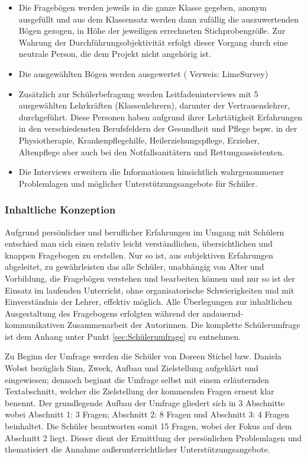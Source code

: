 \begin{itemize}
	\item Die Fragebögen werden jeweils in die ganze Klasse gegeben, anonym ausgefüllt und aus dem Klassensatz werden dann zufällig die auszuwertenden Bögen gezogen, in Höhe der jeweiligen errechneten Stichprobengröße. Zur Wahrung der Durchführungsobjektivität erfolgt dieser Vorgang durch eine neutrale Person, die dem Projekt nicht angehörig ist. 
	\item Die ausgewählten Bögen werden ausgewertet ( Verweis: LimeSurvey)
	\item Zusätzlich zur Schülerbefragung werden Leitfadeninterviews mit 5 ausgewählten Lehrkräften (Klassenlehrern), darunter der Vertrauenslehrer, durchgeführt. Diese Personen haben aufgrund ihrer Lehrtätigkeit Erfahrungen in den verschiedensten Berufsfeldern der Gesundheit und Pflege bspw. in der Physiotherapie, Krankenpflegehilfe, Heilerziehungspflege, Erzieher, Altenpflege aber auch bei den Notfallsanitätern und Rettungsassistenten.
	\item Die Interviews erweitern die Informationen hinsichtlich wahrgenommener Problemlagen und möglicher Unterstützungsangebote für Schüler.
\end{itemize}

\subsubsection{Inhaltliche Konzeption}
\label{sec:InhaltlicheKonzeption}

Aufgrund persönlicher und beruflicher Erfahrungen im Umgang mit Schülern entschied man sich einen relativ leicht verständlichen, übersichtlichen und knappen Fragebogen zu erstellen. Nur so ist, aus subjektiven Erfahrungen abgeleitet, zu gewährleisten das alle Schüler, unabhängig von Alter und Vorbildung, die Fragebögen verstehen und bearbeiten können und nur so ist der Einsatz im laufenden Unterricht, ohne organisatorische Schwierigkeiten und mit Einverständnis der Lehrer, effektiv möglich. Alle Überlegungen zur inhaltlichen Ausgestaltung des Fragebogens erfolgten während der andauernd-kommunikativen Zusammenarbeit der Autorinnen. Die komplette Schülerumfrage ist dem Anhang unter Punkt \ref{sec:Schülerumfrage} zu entnehmen.

Zu Beginn der Umfrage werden die Schüler von Doreen Stichel bzw. Daniela Wobst bezüglich Sinn, Zweck, Aufbau und Zielstellung aufgeklärt und eingewiesen; dennoch beginnt die Umfrage selbst mit einem erläuternden Textabschnitt, welcher die Zielstellung der kommenden Fragen erneut klar benennt. Der grundlegende Aufbau der Umfrage gliedert sich in 3 Abschnitte wobei Abschnitt 1: 3 Fragen; Abschnitt 2: 8 Fragen und Abschnitt 3: 4 Fragen beinhaltet. Die Schüler beantworten somit 15 Fragen, wobei der Fokus auf dem Abschnitt 2 liegt. Dieser dient der Ermittlung der persönlichen Problemlagen und thematisiert die Annahme außerunterrichtlicher Unterstützungsangebote. 

